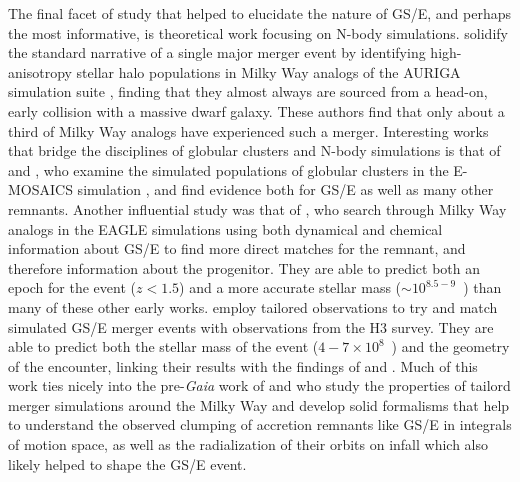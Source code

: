 The final facet of study that helped to elucidate the nature of GS/E, and perhaps the most informative, is theoretical work focusing on N-body simulations. \textcite{fattahi19} solidify the standard narrative of a single major merger event by identifying high-anisotropy stellar halo populations in Milky Way analogs of the AURIGA simulation suite \parencite{grand17}, finding that they almost always are sourced from a head-on, early collision with a massive dwarf galaxy. These authors find that only about a third of Milky Way analogs have experienced such a merger. Interesting works that bridge the disciplines of globular clusters and N-body simulations is that of \textcite{kruijssen19b} and \textcite{kruijssen20}, who examine the simulated populations of globular clusters in the E-MOSAICS simulation \parencite{kruijssen19a}, and find evidence both for GS/E as well as many other remnants. Another influential study was that of \textcite{mackereth19a}, who search through Milky Way analogs in the EAGLE simulations using both dynamical and chemical information about GS/E to find more direct matches for the remnant, and therefore information about the progenitor. They are able to predict both an epoch for the event ($z < 1.5$) and a more accurate stellar mass ($\sim 10^{8.5-9}$~\Msun) than many of these other early works. \textcite{naidu21} employ tailored observations to try and match simulated GS/E merger events with observations from the H3 survey. They are able to predict both the stellar mass of the event ($4-7 \times 10^{8}$~\Msun) and the geometry of the encounter, linking their results with the findings of \textcite{simion19} and \textcite{iorio19}. Much of this work ties nicely into the pre-\textit{Gaia} work of \textcite{amorisco17} and \textcite{jean-baptiste17} who study the properties of tailord merger simulations around the Milky Way and develop solid formalisms that help to understand the observed clumping of accretion remnants like GS/E in integrals of motion space, as well as the radialization of their orbits on infall which also likely helped to shape the GS/E event.

